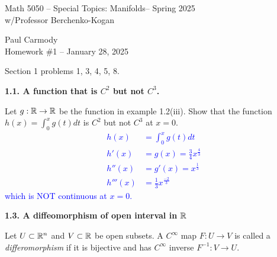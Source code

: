 \documentclass[10pt,a4paper]{report}
\newcommand{\CLASSNAME}{Math 5050 -- Special Topics: Manifolds}
\newcommand{\STUDENTNAME}{Paul Carmody}
\newcommand{\ASSIGNMENT}{Homework \#1 }
\newcommand{\DUEDATE}{January 28, 2025}
\newcommand{\SEMESTER}{Spring 2025}
\newcommand{\BLUE}[1]{\textcolor{blue}{#1}}
\begin{document}
\begin{center}
	\Large{\CLASSNAME -- \SEMESTER} \\
	\large{ w/Professor Berchenko-Kogan}
\end{center}
\begin{center}
	\STUDENTNAME \\
	\ASSIGNMENT -- \DUEDATE\\
\end{center} 

\noindent Section 1 problems 1, 3, 4, 5, 8.

\noindent \textbf{1.1.  A function that is $C^2$ but not $C^3$.}

\noindent Let $g: \mathbb{R} \to \mathbb{R}$ be the function in example 1.2(iii).  Show that the function $h(x) = \int_0^x g(t) dt$ is $C^2$ but not $C^3$ at $x=0$.\\

\BLUE{\begin{align*}
	h(x) &= \int_0^x g(t) dt \\
	h'(x) &= g(x) = \frac{3}{4}x^\frac{4}{3} \\
	h''(x) &= g'(x) = x^\frac{1}{3} \\
	h'''(x) &= \frac{1}{3}x^\frac{-2}{3}
\end{align*}which is NOT continuous at $x=0$.\\
}

\noindent \textbf{1.3.  A diffeomorphism of open interval in $\mathbb{R}$}

\noindent Let $U \subset \mathbb{R}^n$ and $V \subset \mathbb{R}$ be open subsets.  A $C^\infty$ map $F:U \to V$ is called a \textit{differomorphism} if it is bijective and has  $C^\infty$ inverse $F^{-1}: V\to U$.
\end{document}
